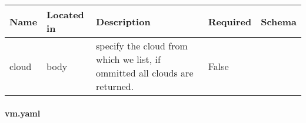 \documentclass[9pt,]{article}
\let\oldparagraph\paragraph
\renewcommand{\paragraph}[1]{\oldparagraph{#1}\mbox{}}
\begin{document}
\begin{longtable}[]{@{}lllll@{}}
\toprule
\begin{minipage}[b]{0.10\columnwidth}\raggedright
Name\strut
\end{minipage} & \begin{minipage}[b]{0.11\columnwidth}\raggedright
Located in\strut
\end{minipage} & \begin{minipage}[b]{0.40\columnwidth}\raggedright
Description\strut
\end{minipage} & \begin{minipage}[b]{0.12\columnwidth}\raggedright
Required\strut
\end{minipage} & \begin{minipage}[b]{0.12\columnwidth}\raggedright
Schema\strut
\end{minipage}\tabularnewline
\midrule
\endhead
\begin{minipage}[t]{0.10\columnwidth}\raggedright
cloud\strut
\end{minipage} & \begin{minipage}[t]{0.11\columnwidth}\raggedright
body\strut
\end{minipage} & \begin{minipage}[t]{0.40\columnwidth}\raggedright
specify the cloud from which we list, if ommitted all clouds are
returned.\strut
\end{minipage} & \begin{minipage}[t]{0.12\columnwidth}\raggedright
False\strut
\end{minipage} & \begin{minipage}[t]{0.12\columnwidth}\raggedright
\strut
\end{minipage}\tabularnewline
\bottomrule
\end{longtable}

\hypertarget{vm.yaml}{%
\paragraph{vm.yaml}\label{vm.yaml}}
\end{document}
